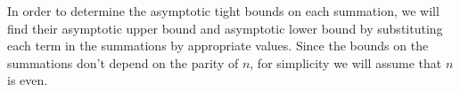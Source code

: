 In order to determine the asymptotic tight bounds on each summation, we will find their asymptotic upper bound and asymptotic lower bound by substituting each term in the summations by appropriate values.
Since the bounds on the summations don't depend on the parity of $n$, for simplicity we will assume that $n$ is even.
